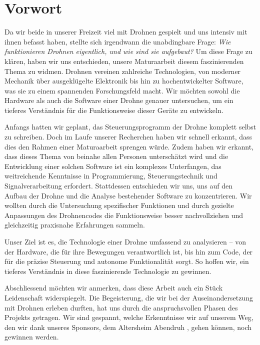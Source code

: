\chapter*{Vorwort}

Da wir beide in unserer Freizeit viel mit Drohnen gespielt und uns intensiv mit ihnen befasst haben, stellte sich irgendwann die unabdingbare Frage: \textit{Wie funktionieren Drohnen eigentlich, und wie sind sie aufgebaut?} Um diese Frage zu klären, haben wir uns entschieden, unsere Maturaarbeit diesem faszinierenden Thema zu widmen. Drohnen vereinen zahlreiche Technologien, von moderner Mechanik über ausgeklügelte Elektronik bis hin zu hochentwickelter Software, was sie zu einem spannenden Forschungsfeld macht. Wir möchten sowohl die Hardware als auch die Software einer Drohne genauer untersuchen, um ein tieferes Verständnis für die Funktionsweise dieser Geräte zu entwickeln.

Anfangs hatten wir geplant, das Steuerungsprogramm der Drohne komplett selbst zu schreiben. Doch im Laufe unserer Recherchen haben wir schnell erkannt, dass dies den Rahmen einer Maturaarbeit sprengen würde. Zudem haben wir erkannt, dass dieses Thema von beinahe allen Personen unterschätzt wird und die Entwicklung einer solchen Software ist ein komplexes Unterfangen, das weitreichende Kenntnisse in Programmierung, Steuerungstechnik und Signalverarbeitung erfordert. Stattdessen entschieden wir uns, uns auf den Aufbau der Drohne und die Analyse bestehender Software zu konzentrieren. Wir wollten durch die Untersuchung spezifischer Funktionen und durch gezielte Anpassungen des Drohnencodes die Funktionsweise besser nachvollziehen und gleichzeitig praxisnahe Erfahrungen sammeln.

Unser Ziel ist es, die Technologie einer Drohne umfassend zu analysieren – von der Hardware, die für ihre Bewegungen verantwortlich ist, bis hin zum Code, der für die präzise Steuerung und autonome Funktionalität sorgt. So hoffen wir, ein tieferes Verständnis in diese faszinierende Technologie zu gewinnen.

Abschliessend möchten wir anmerken, dass diese Arbeit auch ein Stück Leidenschaft widerspiegelt. Die Begeisterung, die wir bei der Auseinandersetzung mit Drohnen erleben durften, hat uns durch die anspruchsvollen Phasen des Projekts getragen. Wir sind gespannt, welche Erkenntnisse wir auf unserem Weg, den wir dank unseres Sponsors, dem Altersheim Abendruh \cite{Altersheim}, gehen können, noch gewinnen werden.